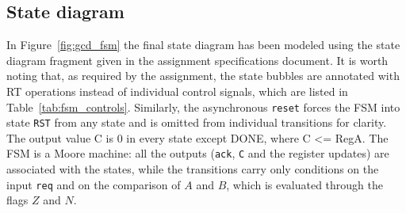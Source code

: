 \subsection{State diagram}

In Figure~\ref{fig:gcd_fsm} the final state diagram has been modeled using the state diagram fragment given in the assignment specifications document. It is worth noting that, as required by the assignment, the state bubbles are annotated with RT operations instead of individual control signals, which are listed in Table~\ref{tab:fsm_controls}. Similarly, the asynchronous \texttt{reset} forces the FSM into state \texttt{RST} from any state and is omitted from individual transitions for clarity. The output value C is 0 in every state except DONE, where C <= RegA. The FSM is a Moore machine: all the outputs (\texttt{ack}, \texttt{C} and the register updates) are associated with the states, while the transitions carry only conditions on the input \texttt{req} and on the comparison of $A$ and $B$, which is evaluated through the flags $Z$ and $N$.


